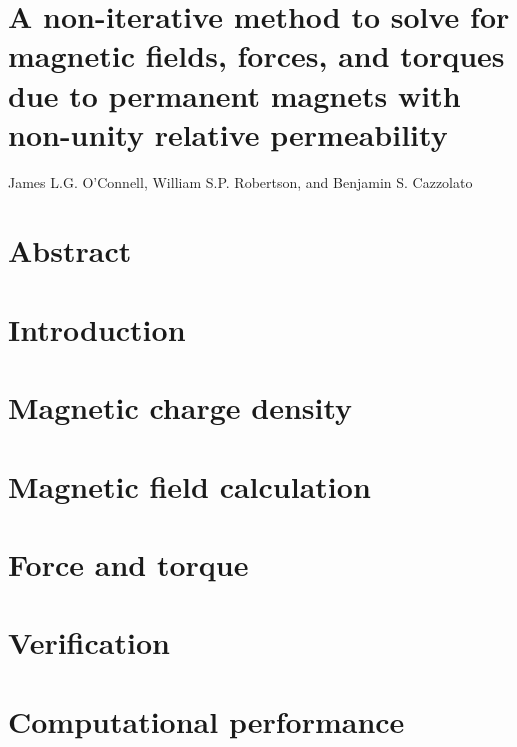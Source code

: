 %
%
\section*{\LARGE A non-iterative method to solve for magnetic fields, forces, and torques due to permanent magnets with non-unity relative permeability}
James L.G. O'Connell, William S.P. Robertson, and Benjamin S. Cazzolato
\section*{Abstract}\label{sec:p4abstract}

\section{Introduction}\label{sec:p4introduction}

\section{Magnetic charge density}\label{sec:p4magneticChargeDensity}

\section{Magnetic field calculation}\label{sec:p4magneticField}

\section{Force and torque}\label{sec:p4forceAndTorque}

\section{Verification}\label{sec:p4verification}

\section{Computational performance}\label{sec:p4computationalPerformance}

